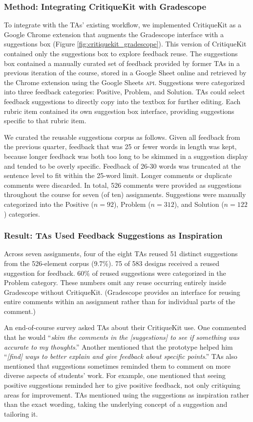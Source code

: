 \subsubsection{Method: Integrating CritiqueKit with Gradescope}
To integrate with the TAs' existing workflow, we implemented CritiqueKit as a Google Chrome extension that augments the Gradescope interface with a suggestions box (Figure \ref{fig:critiquekit_gradescope}). This version of CritiqueKit contained only the suggestions box to explore feedback reuse. The suggestions box contained a manually curated set of feedback provided by former TAs in a previous iteration of the course, stored in a Google Sheet online and retrieved by the Chrome extension using the Google Sheets \textsc{api}. Suggestions were categorized into three feedback categories: Positive, Problem, and Solution. TAs could select feedback suggestions to directly copy into the textbox for further editing. Each rubric item contained its own suggestion box interface, providing suggestions specific to that rubric item.

We curated the reusable suggestions corpus as follows. Given all feedback from the previous quarter, feedback that was 25 or fewer words in length was kept, because longer feedback was both too long to be skimmed in a suggestion display and tended to be overly specific. Feedback of 26-30 words was truncated at the sentence level to fit within the 25-word limit. Longer comments or duplicate comments were discarded. In total, 526 comments were provided as suggestions throughout the course for seven (of ten) assignments. Suggestions were manually categorized into the Positive ($n = 92$), Problem ($n = 312$), and Solution ($n = 122$) categories.

\subsubsection{Result: TAs Used Feedback Suggestions as Inspiration}
Across seven assignments, four of the eight TAs reused 51 distinct suggestions from the 526-element corpus (9.7\%). 75 of 583 designs received a reused suggestion for feedback. 60\% of reused suggestions were categorized in the Problem category. These numbers omit any reuse occurring entirely inside Gradescope without CritiqueKit. (Gradescope provides an interface for reusing entire comments within an assignment rather than for individual parts of the comment.) 

An end-of-course survey asked TAs about their CritiqueKit use. One commented that he would ``\textit{skim the comments in the [suggestions] to see if something was accurate to my thoughts}.'' Another mentioned that the prototype helped him ``\textit{[find] ways to better explain and give feedback about specific points}.'' TAs also mentioned that suggestions sometimes reminded them to comment on more diverse aspects of students' work. For example, one mentioned that seeing positive suggestions reminded her to give positive feedback, not only critiquing areas for improvement. TAs mentioned using the suggestions as inspiration rather than the exact wording, taking the underlying concept of a suggestion and tailoring it.

